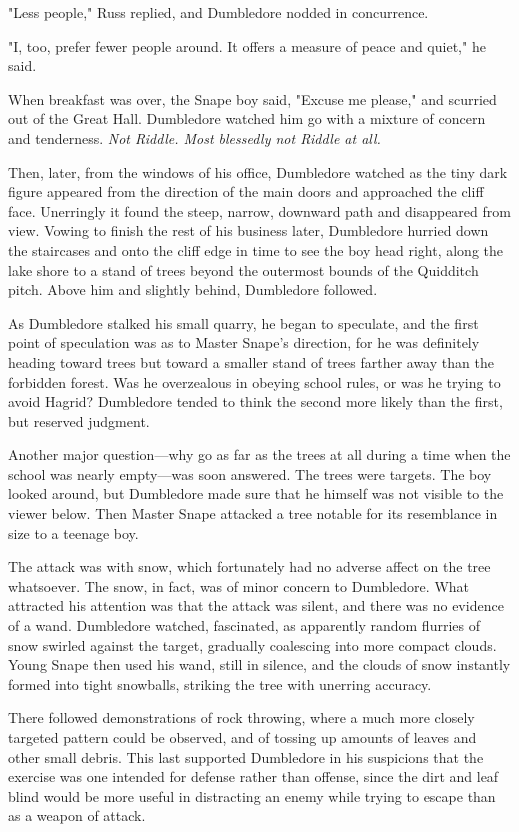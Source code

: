 "Less people," Russ replied, and Dumbledore nodded in concurrence.

"I, too, prefer fewer people around. It offers a measure of peace and quiet," he said.

When breakfast was over, the Snape boy said, "Excuse me{\el} please," and scurried out of the Great Hall. Dumbledore watched him go with a mixture of concern and tenderness. \emph{Not Riddle. Most blessedly not Riddle at all.}

Then, later, from the windows of his office, Dumbledore watched as the tiny dark figure appeared from the direction of the main doors and approached the cliff face. Unerringly it found the steep, narrow, downward path and disappeared from view. Vowing to finish the rest of his business later, Dumbledore hurried down the staircases and onto the cliff edge in time to see the boy head right, along the lake shore to a stand of trees beyond the outermost bounds of the Quidditch pitch. Above him and slightly behind, Dumbledore followed.

As Dumbledore stalked his small quarry, he began to speculate, and the first point of speculation was as to Master Snape's direction, for he was definitely heading toward trees but toward a smaller stand of trees farther away than the forbidden forest. Was he overzealous in obeying school rules, or was he trying to avoid Hagrid? Dumbledore tended to think the second more likely than the first, but reserved judgment.

Another major question—why go as far as the trees at all during a time when the school was nearly empty—was soon answered. The trees were targets. The boy looked around, but Dumbledore made sure that he himself was not visible to the viewer below. Then Master Snape attacked a tree notable for its resemblance in size to a teenage boy.

The attack was with snow, which fortunately had no adverse affect on the tree whatsoever. The snow, in fact, was of minor concern to Dumbledore. What attracted his attention was that the attack was silent, and there was no evidence of a wand. Dumbledore watched, fascinated, as apparently random flurries of snow swirled against the target, gradually coalescing into more compact clouds. Young Snape then used his wand, still in silence, and the clouds of snow instantly formed into tight snowballs, striking the tree with unerring accuracy.

There followed demonstrations of rock throwing, where a much more closely targeted pattern could be observed, and of tossing up amounts of leaves and other small debris. This last supported Dumbledore in his suspicions that the exercise was one intended for defense rather than offense, since the dirt and leaf blind would be more useful in distracting an enemy while trying to escape than as a weapon of attack.

